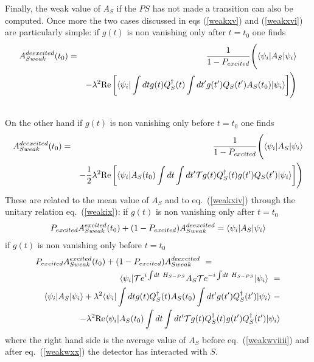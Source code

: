 \documentclass[12pt,oneside]{report}
\def\ket#1{|#1\rangle}
\def\bra#1{\langle #1|}
\def\la{\lambda}
\def\p {\prime}
\newcommand{\bi}{\mbox{$ \bra{\psi_i} $}}
\begin{document}
Finally, the weak value of $A_S$ if the $PS$ has not made a
transition can also be computed. 
Once more the two cases discussed in eqs (\ref{weakxv}) and (\ref{weakxvi})
are particularly simple: if $g(t)$ is non vanishing only after $t=t_0$ one
finds \begin{eqnarray}
A_{S weak}^{deexcited}(t_0) &=&{1 \over 1 - P_{excited}  }\Biggl(
\bra{\psi_i}A_S\ket{\psi_i} \nonumber\\
& &-\la^2 {\rm Re}  \left[
\bi \int dt g(t) Q_S^\dagger (t)
 \int dt^\p g(t^\p) Q_S(t^\p)  A_S(t_0) \ki\right]\Biggr)\nonumber\\
&&  \label{weakxvii}
\end{eqnarray}
On the other hand if $g(t)$ is non vanishing only before $t=t_0$ one finds
\begin{eqnarray}
A_{S weak}^{deexcited}(t_0) &=&{1 \over 1 - P_{excited}  }\Biggl(
\bra{\psi_i}A_S\ket{\psi_i} \nonumber\\
& & -{1 \over 2} \la^2 {\rm Re} \left[
\bi A_S(t_0) \int dt 
 \int dt^\p {\cal T} g(t) Q_S^\dagger (t) g(t^\p) Q_S(t^\p)   \ki\right]
\Biggr) \nonumber\\
\label{weakxviii} \end{eqnarray}
These are related to the mean value of $A_S$
and to eq.~(\ref{weakxiv}) through the unitary relation eq.~(\ref{weakix}):
if $g(t)$ is non vanishing only after $t=t_0$
\begin{eqnarray}
 P_{excited}A_{S weak}^{excited}(t_0)
+ (1 - P_{excited} )A_{S weak}^{deexcited}
= \bi A_S \ki \label{weakwviiii}
\end{eqnarray}
if $g(t)$ is non vanishing only before $t=t_0$
\begin{eqnarray}
\lefteqn{ P_{excited}A_{S weak}^{excited}(t_0)
+ (1 - P_{excited} )A_{S weak}^{deexcited}\ =}\nonumber\\ 
& &
\bi {\cal T} e^{i\int \! dt \ H_{S-PS}}
A_S 
{\cal T} e^{-i\int \! dt \ H_{S-PS}}
\ki
\ =
\nonumber\\ 
& &\bi A_S \ki 
  +\la^2 
\bi \int dt g(t) Q_S^\dagger (t) A_S(t_0)
\int dt^\p g(t^\p) Q_S^\dagger (t^\p)\ki \ -\nonumber\\
& &  -\la^2 {\rm Re } \bi A_S(t_0) \int dt
\int dt^\p {\cal T} g(t) Q_S^\dagger (t) g(t^\p) Q_S^\dagger (t^\p)\ki 
\label{weakwxx}
\end{eqnarray}
where the right hand side is the average value of $A_S$ before
eq.~(\ref{weakwviiii}) and after eq.~(\ref{weakwxx}) the detector has interacted with $S$.

\end{document}
